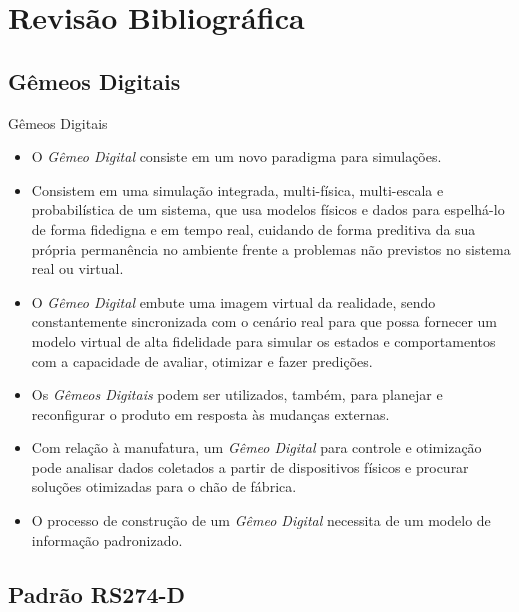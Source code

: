 \documentclass[aspectratio=169]{beamer}
\begin{document}
{\section{Revisão Bibliográfica}


\subsection{Gêmeos Digitais}

\begin{frame}{Gêmeos Digitais}

  \begin{itemize}
    \item {
      O \emph{Gêmeo Digital} consiste em um novo paradigma para 
      simula\c c\~oes.
    }
    \item {
      Consistem em uma simulação integrada, multi-física, multi-escala e 
      probabilística de um sistema, que usa modelos físicos e dados para
      espelhá-lo de forma fidedigna e em tempo real, cuidando de forma 
      preditiva da sua própria permanência no ambiente frente a problemas 
      não previstos no sistema real ou virtual.
    }
    \item {
      O \emph{Gêmeo Digital} embute uma imagem virtual da realidade, 
      sendo constantemente sincronizada com o cen\'ario real para que 
      possa fornecer um modelo virtual de alta fidelidade para simular 
      os estados e comportamentos com a capacidade de avaliar, otimizar 
      e fazer predi\c c\~oes.
    }
    \item {
      Os \emph{Gêmeos Digitais} podem ser utilizados, tamb\'em, para 
      planejar e reconfigurar o produto em resposta \`as mudan\c cas 
      externas.
    }
    \item {
      Com rela\c c\~ao \`a manufatura, um \emph{Gêmeo Digital} para 
      controle e otimiza\c c\~ao pode analisar dados coletados a partir de 
      dispositivos f\'isicos e procurar solu\c c\~oes otimizadas para o 
      ch\~ao de f\'abrica.
    }
    \item {
      O processo de constru\c c\~ao de um \emph{Gêmeo Digital} necessita 
      de um modelo de informa\c c\~ao padronizado.
    }
  \end{itemize}

\end{frame}  


\subsection{Padrão RS274-D}

}
\end{document}
